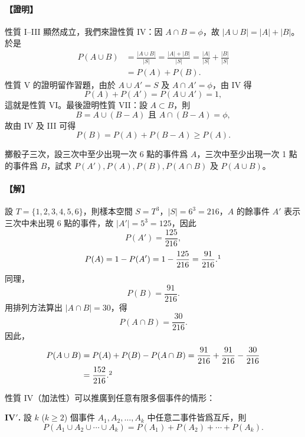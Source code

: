 \medskip
\paragraph{【證明】}
性質 I--III 顯然成立，我們來證性質 IV：因 $A \cap B = \phi$，故 $|A \cup B| = |A| + |B|$。於是
\begin{align*}
P(A \cup B) &= \frac{|A \cup B|}{|S|} = \frac{|A| + |B|}{|S|} = \frac{|A|}{|S|} + \frac{|B|}{|S|} \\
&= P(A) + P(B).
\end{align*}
性質 V 的證明留作習題，由於 $A \cup A' = S$ 及 $A \cap A' = \phi$，由 IV 得
\[
P(A) + P(A') = P(A \cup A') = 1,
\]
這就是性質 VI。最後證明性質 VII：設 $A \subset B$，則
\[
B = A \cup (B - A) \text{ 且 } A \cap (B - A) = \phi,
\]
故由 IV 及 III 可得
\[
P(B) = P(A) + P(B - A) \ge P(A). \tag*{\#}
\]

\medskip
\begin{discussion}\label{disc:b5s-3-2}
擲骰子三次，設三次中至少出現一次 6 點的事件爲 $A$，三次中至少出現一次 1 點的事件爲 $B$，試求 $P(A'), P(A), P(B), P(A \cap B)$ 及 $P(A \cup B)$。
\end{discussion}
\paragraph{【解】}
設 $T=\{1, 2, 3, 4, 5, 6\}$，則樣本空間 $S=T^3$，$|S|=6^3=216$，$A$ 的餘事件 $A'$ 表示三次中未出現 6 點的事件，故 $|A'|=5^3=125$，因此
\[
P(A') = \frac{125}{216},
\]
\[
P(A) = 1 - P(A') = 1 - \frac{125}{216} = \frac{91}{216}.\footnotemark
\]
\label{note:b5s-ch3-p99-pa}
同理，
\[
P(B) = \frac{91}{216}.
\]
用排列方法算出 $|A \cap B| = 30$，得
\[
P(A \cap B) = \frac{30}{216}.
\]
因此，
\begin{align*}
P(A \cup B) &= P(A) + P(B) - P(A \cap B) = \frac{91}{216} + \frac{91}{216} - \frac{30}{216} \\
&= \frac{152}{216}.\footnotemark
\end{align*}
\label{note:b5s-ch3-p100-152}

性質 IV（加法性）可以推廣到任意有限多個事件的情形：

\medskip
\noindent\textbf{IV$'$.} 設 $k$ ($k \ge 2$) 個事件 $A_1, A_2, \dots, A_k$ 中任意二事件皆爲互斥，則
\[
P(A_1 \cup A_2 \cup \cdots \cup A_k) = P(A_1) + P(A_2) + \cdots + P(A_k).
\]

